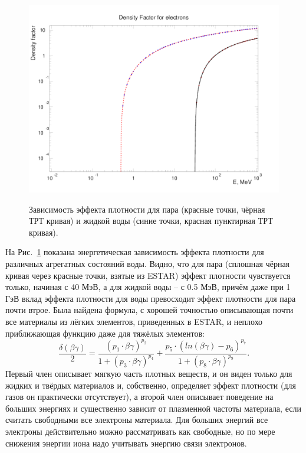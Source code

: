 \documentclass[a4paper,12pt]{article}
\begin{document}
\begin{large}
  \begin{figure}[ht]
    {
       \includegraphics[width=0.99\linewidth]{images/denf_wat}
    }
    \caption{Зависимость эффекта плотности для пара  (красные точки, чёрная ТРТ кривая) и жидкой воды (синие точки, красная пунктирная ТРТ кривая).}
    \label{fig:denf_wat}
  \end{figure}
  На Рис.~\ref{fig:denf_wat} показана энергетическая зависимость эффекта плотности для различных агрегатных состояний воды.
  Видно, что для пара (сплошная чёрная кривая через красные точки, взятые из ESTAR) эффект плотности чувствуется только, начиная с 40 МэВ, а для жидкой воды -- с 0.5 МэВ, причём даже при 1 ГэВ вклад эффекта плотности для воды превосходит эффект плотности для пара почти втрое.
  Была найдена формула, с хорошей точностью описывающая почти все материалы из лёгких элементов, приведенных в ESTAR, и неплохо приближающая функцию даже для тяжёлых элементов:
  \begin{equation}
  \label{DnfApprox}
     \frac{\delta(\beta\gamma)}{2}=\frac{(p_1\cdot\beta\gamma)^{p_2}}{1+(p_3\cdot\beta\gamma)^{p_4}}+\frac{p_5\cdot(ln(\beta\gamma)-p_6)^{p_7}}{1+(p_8\cdot\beta\gamma)^{p_9}}.
  \end{equation}
  Первый член описывает мягкую часть плотных веществ, и он виден только для жидких и твёрдых материалов и, собственно, определяет эффект плотности (для газов он практически отсутствует), а второй член описывает поведение на больших энергиях и существенно зависит от плазменной частоты материала, если считать свободными все электроны материала.
  Для больших энергий все электроны действительно можно рассматривать как свободные, но по мере снижения энергии иона надо учитывать энергию связи электронов.
  

\end{large}
\end{document}
